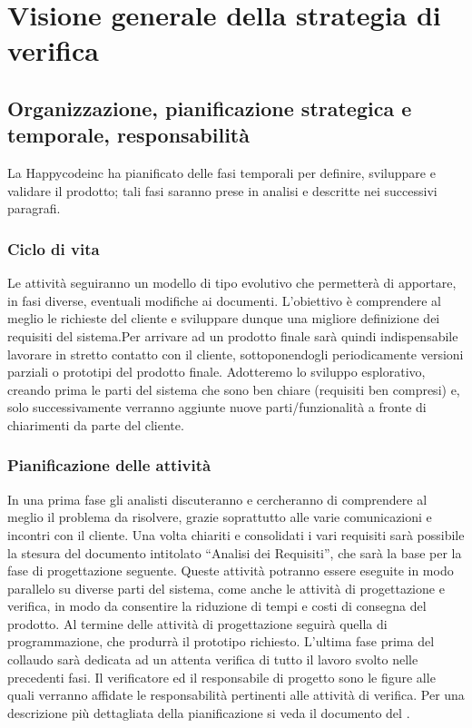 \documentclass[11pt,titlepage,a4paper]{report}
\begin{document}
\chapter[Strategia di verifica]{Visione generale della strategia di verifica}
\section[Organizzazione, pianificazione, responsabilit\`a]{Organizzazione, pianificazione strategica e temporale, responsabilit\`a}
La Happycodeinc ha  pianificato delle fasi temporali per definire, sviluppare e validare il prodotto; tali fasi saranno prese in analisi e descritte nei successivi paragrafi.

\subsection{Ciclo di vita}
Le attivit\`a seguiranno un modello di tipo evolutivo che permetter\`a di apportare, in fasi diverse, eventuali modifiche ai documenti. L'obiettivo \`e comprendere al meglio le richieste del cliente e sviluppare dunque una migliore definizione dei requisiti del sistema.\newline Per arrivare ad un prodotto finale sar\`a quindi indispensabile lavorare in stretto contatto con il cliente, sottoponendogli periodicamente versioni parziali o prototipi del prodotto finale. Adotteremo lo sviluppo esplorativo, creando prima le parti del sistema che sono ben chiare (requisiti ben compresi) e, solo successivamente verranno aggiunte nuove parti/funzionalit\`a a fronte di chiarimenti da parte del cliente. 
\subsection{Pianificazione delle attivit\`a}
In una prima fase gli analisti discuteranno e cercheranno di comprendere al meglio il problema da risolvere, grazie soprattutto alle varie comunicazioni e incontri con il cliente. Una volta chiariti e consolidati i vari requisiti sar\`a possibile la stesura del documento intitolato ``Analisi dei Requisiti'', che sar\`a la base per la fase di progettazione seguente. Queste attivit\`a potranno essere eseguite in modo parallelo su diverse parti del sistema, come anche le attivit\`a di progettazione e verifica, in modo da consentire la riduzione di tempi e costi di consegna del prodotto. Al termine delle attivit\`a di progettazione seguir\`a quella di programmazione, che produrr\`a il prototipo richiesto. L'ultima fase prima del collaudo sar\`a dedicata ad un attenta verifica di tutto il lavoro svolto nelle precedenti fasi. Il verificatore ed il responsabile di progetto sono le figure alle quali verranno affidate le responsabilit\`a pertinenti alle attivit\`a di verifica. Per una descrizione pi\`u dettagliata della pianificazione si veda il documento del \PianoDiProgetto .
\end{document}
